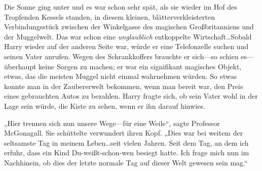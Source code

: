 Die Sonne ging unter und es war schon sehr spät, als sie wieder im Hof des Tropfenden Kessels standen, in diesem kleinen, blätterverkleisterten Verbindungsstück zwischen der Winkelgasse des magischen Großbritanniens und der Muggelwelt. Das war schon eine \emph{unglaublich} entkoppelte Wirtschaft…Sobald Harry wieder auf der anderen Seite war, würde er eine Telefonzelle suchen und seinen Vater anrufen. Wegen des Schrankkoffers brauchte er sich—so schien es—überhaupt keine Sorgen zu machen; er war ein signifikant magisches Objekt, etwas, das die meisten Muggel nicht einmal wahrnehmen würden. So etwas konnte man in der Zaubererwelt bekommen, wenn man bereit war, den Preis eines gebrauchten Autos zu bezahlen. Harry fragte sich, ob sein Vater wohl in der Lage sein würde, die Kiste zu sehen, wenn er ihn darauf hinwies.

„Hier trennen sich nun unsere Wege—für eine Weile“, sagte Professor McGonagall. Sie schüttelte verwundert ihren Kopf. „Dies war bei weitem der seltsamste Tag in meinem Leben…seit vielen Jahren. Seit dem Tag, an dem ich erfuhr, dass ein Kind Du-weißt-schon-wen besiegt hatte. Ich frage mich nun im Nachhinein, ob dies der letzte normale Tag auf dieser Welt gewesen sein mag.“

